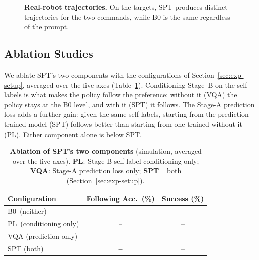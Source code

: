 \documentclass{article}
\begin{document}
\begin{figure}[t]
  \centering
  \caption{\textbf{Real-robot trajectories.} On the targets, SPT produces
  distinct trajectories for the two commands, while B0 is the same regardless of
  the prompt.}
  \label{fig:real_overlay}
\end{figure}

\subsection{Ablation Studies}
\label{sec:exp-ablation}

We ablate SPT's two components with the configurations of
Section~\ref{sec:exp-setup}, averaged over the five axes
(Table~\ref{tab:ablation}). Conditioning Stage~B on the self-labels is what makes
the policy follow the preference: without it (VQA) the policy stays at the B0
level, and with it (SPT) it follows. The Stage-A prediction loss adds a further
gain: given the same self-labels, starting from the prediction-trained model
(SPT) follows better than starting from one trained without it (PL). Either
component alone is below SPT.

\begin{table}[t]
  \centering
  \small
  \caption{\textbf{Ablation of SPT's two components} (simulation, averaged over
  the five axes). \textbf{PL}: Stage-B self-label conditioning only;
  \textbf{VQA}: Stage-A prediction loss only; \textbf{SPT}\,=\,both
  (Section~\ref{sec:exp-setup}).}
  \label{tab:ablation}
  \begin{tabular}{lcc}
    \hline
    Configuration & Following Acc.\ (\%) & Success (\%) \\
    \hline
    B0 \,(neither)              & -- & -- \\
    PL \,(conditioning only)    & -- & -- \\
    VQA (prediction only)       & -- & -- \\
    SPT (both)                  & \textbf{--} & -- \\
    \hline
  \end{tabular}
\end{table}
\end{document}
